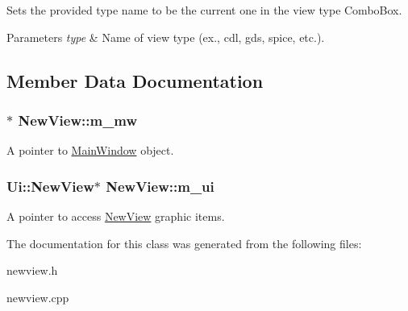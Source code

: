 Sets the provided type name to be the current one in the view type Combo\-Box. 



 
\begin{DoxyParams}{Parameters}
{\em type} & Name of view type (ex., cdl, gds, spice, etc.). \\
\hline
\end{DoxyParams}


\subsection{Member Data Documentation}
\hypertarget{classNewView_a086dc0337a001800ccd5abaef3f7d815}{
\subsubsection[{m\-\_\-mw}]{$\ast$ New\-View\-::m\-\_\-mw\hspace{0.3cm}{\ttfamily [private]}}}\label{classNewView_a086dc0337a001800ccd5abaef3f7d815}
A pointer to \hyperlink{classMainWindow}{Main\-Window} object. \hypertarget{classNewView_ab8a3d70ca1c0826d69d4411a21f365e0}{
\subsubsection[{m\-\_\-ui}]{\setlength{\rightskip}{0pt plus 5cm}Ui\-::\-New\-View$\ast$ New\-View\-::m\-\_\-ui\hspace{0.3cm}{\ttfamily [private]}}}\label{classNewView_ab8a3d70ca1c0826d69d4411a21f365e0}
A pointer to access \hyperlink{classNewView}{New\-View} graphic items. 

The documentation for this class was generated from the following files\-:\begin{DoxyCompactItemize}
\item 
newview.\-h\item 
newview.\-cpp\end{DoxyCompactItemize}

